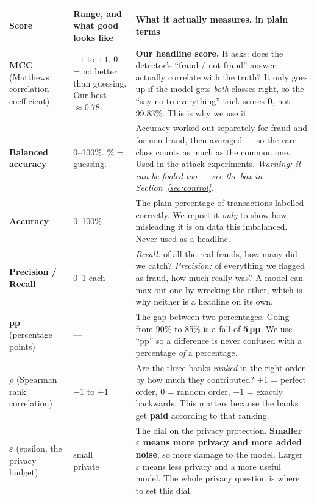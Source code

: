 \documentclass[11pt]{article}
\newcommand{\eps}{\ensuremath{\varepsilon}}
\newcommand{\rh}{\ensuremath{\rho}}
\begin{document}
\begin{center}\small
\renewcommand{\arraystretch}{1.25}
\begin{tabularx}{\linewidth}{@{}p{3.1cm} p{2.6cm} X@{}}
\toprule
\textbf{Score} & \textbf{Range, and what good looks like} & \textbf{What it actually measures, in plain terms} \\
\midrule
\textbf{MCC} \newline (Matthews correlation coefficient) & $-1$ to $+1$. \newline $0$ = no better than guessing. \newline Our best $\approx 0.78$. & \textbf{Our headline score.} It asks: does the detector's ``fraud / not fraud'' answer actually correlate with the truth? It only goes up if the model gets \emph{both} classes right, so the ``say no to everything'' trick scores \textbf{0}, not 99.83\%. This is why we use it. \\
\textbf{Balanced accuracy} & 0--100\%. \newline 50\% = guessing. & Accuracy worked out separately for fraud and for non-fraud, then averaged --- so the rare class counts as much as the common one. Used in the attack experiments. \emph{Warning: it can be fooled too --- see the box in Section~\ref{sec:control}.} \\
\textbf{Accuracy} & 0--100\% & The plain percentage of transactions labelled correctly. We report it \emph{only} to show how misleading it is on data this imbalanced. Never used as a headline. \\
\textbf{Precision / Recall} & 0--1 each & \emph{Recall:} of all the real frauds, how many did we catch? \emph{Precision:} of everything we flagged as fraud, how much really was? A model can max out one by wrecking the other, which is why neither is a headline on its own. \\
\textbf{pp} \newline (percentage points) & --- & The gap between two percentages. Going from 90\% to 85\% is a fall of \textbf{5\,pp}. We use ``pp'' so a difference is never confused with a percentage \emph{of} a percentage. \\
\textbf{\rh{}} \newline (Spearman rank correlation) & $-1$ to $+1$ & Are the three banks \emph{ranked} in the right order by how much they contributed? $+1$ = perfect order, $0$ = random order, $-1$ = exactly backwards. This matters because the banks get \textbf{paid} according to that ranking. \\
\textbf{\eps{}} \newline (epsilon, the privacy budget) & small = private & The dial on the privacy protection. \textbf{Smaller \eps{} means more privacy and more added noise}, so more damage to the model. Larger \eps{} means less privacy and a more useful model. The whole privacy question is where to set this dial. \\

\end{tabularx}
\end{center}
\end{document}
